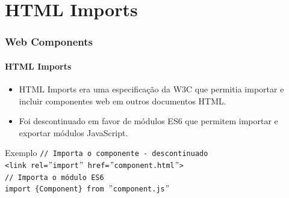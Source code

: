 \documentclass[
	9pt, %
	t, %
]{beamer}
\begin{document}
\section{HTML Imports}

\begin{frame}
	\frametitle{Web Components}
	\framesubtitle{HTML Imports}
	\begin{itemize}
		\item HTML Imports era uma especificação da W3C que permitia importar e incluir componentes web em outros documentos HTML.
		\item Foi descontinuado em favor de módulos ES6 que permitem importar e exportar módulos JavaScript.
	\end{itemize}

	\begin{block}{Exemplo}
		\texttt{// Importa o componente - \alert{descontinuado}}\\
		\texttt{<link rel=$"$import$"$ href=$"$component.html$"$>}\\

		\bigskip 
		\texttt{// Importa o módulo ES6}\\
		\texttt{import \{Component\} from $"$component.js$"$}
	\end{block}

\end{frame}
\end{document}
